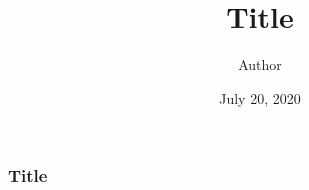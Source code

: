 \documentclass{beamer}
\title{Title}
\author{Author}
\date{July 20, 2020}
\institute{Institute}
\begin{document}
\begin{frame}
	\titlepage
\end{frame}

\begin{frame}
	\frametitle{Title}
\end{frame}
\end{document}
